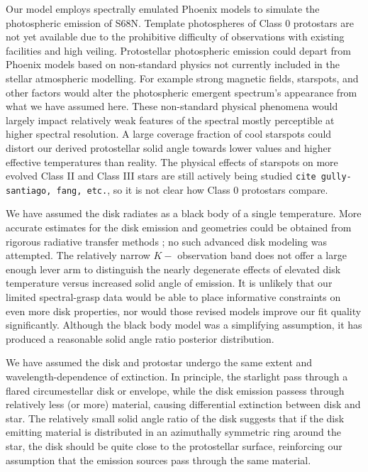 \documentclass[twocolumn]{emulateapj}%
\begin{document}
Our model employs spectrally emulated Phoenix models to simulate the photospheric emission of S68N.  Template photospheres of Class 0 protostars are not yet available due to the prohibitive difficulty of observations with existing facilities and high veiling.  Protostellar photospheric emission could depart from Phoenix models based on non-standard physics not currently included in the stellar atmospheric modelling.  For example strong magnetic fields, starspots, and other factors would alter the photospheric emergent spectrum's appearance from what we have assumed here.  These non-standard physical phenomena would largely impact relatively weak features of the spectral mostly perceptible at higher spectral resolution.  A large coverage fraction of cool starspots could distort our derived protostellar solid angle towards lower values and higher effective temperatures than reality.  The physical effects of starspots on more evolved Class II and Class III stars are still actively being studied \texttt{cite gully-santiago, fang, etc.}, so it is not clear how Class 0 protostars compare.  

We have assumed the disk radiates as a black body of a single temperature.  More accurate estimates for the disk emission and geometries could be obtained from rigorous radiative transfer methods \citep[][\emph{e.g.}]{2017arXiv170305765R}; no such advanced disk modeling was attempted.  The relatively narrow $K-$ observation band does not offer a large enough lever arm to distinguish the nearly degenerate effects of elevated disk temperature versus increased solid angle of emission.  It is unlikely that our limited spectral-grasp data would be able to place informative constraints on even more disk properties, nor would those revised models improve our fit quality significantly.  Although the black body model was a simplifying assumption, it has produced a reasonable solid angle ratio posterior distribution.

We have assumed the disk and protostar undergo the same extent and wavelength-dependence of extinction.  In principle, the starlight pass through a flared circumestellar disk or envelope, while the disk emission passess through relatively less (or more) material, causing differential extinction between disk and star.  The relatively small solid angle ratio of the disk suggests that if the disk emitting material is distributed in an azimuthally symmetric ring around the star, the disk should be quite close to the protostellar surface, reinforcing our assumption that the emission sources pass through the same material.
\end{document}
